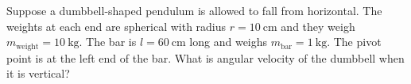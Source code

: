 \documentclass[../classical_mechanics.tex]{subfiles}
\begin{document}
        \begin{example}
            Suppose a dumbbell-shaped pendulum is allowed to fall from horizontal.
            The weights at each end are spherical with radius $r=\qty{10}{\centi\meter}$ and they weigh $m_\text{weight}=\qty{10}{\kilogram}$.
            The bar is $l=\qty{60}{\centi\meter}$ long and weighs $m_\text{bar}=\qty{1}{\kilogram}$.
            The pivot point is at the left end of the bar.
            What is angular velocity of the dumbbell when it is vertical?
            \begin{figure}[H]
                \centering
            \end{figure}
            

\end{example}
\end{document}
